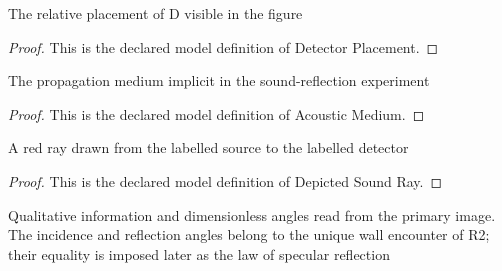 \begin{definition}
  \label{def:physics:phyx-mini-0330:phyxminiproblems-problemphyxmini0330-detectorplacement}
  The relative placement of D visible in the figure
\end{definition}
\begin{proof}
  This is the declared model definition of Detector Placement.
\end{proof}
\begin{definition}
  \label{def:physics:phyx-mini-0330:phyxminiproblems-problemphyxmini0330-acousticmedium}
  The propagation medium implicit in the sound-reflection experiment
\end{definition}
\begin{proof}
  This is the declared model definition of Acoustic Medium.
\end{proof}
\begin{definition}
  \label{def:physics:phyx-mini-0330:phyxminiproblems-problemphyxmini0330-depictedsoundray}
  A red ray drawn from the labelled source to the labelled detector
\end{definition}
\begin{proof}
  This is the declared model definition of Depicted Sound Ray.
\end{proof}
\begin{definition}
  \label{def:physics:phyx-mini-0330:phyxminiproblems-problemphyxmini0330-soundreflectionfigure}
  Qualitative information and dimensionless angles read from the primary image. The incidence and reflection angles belong to the unique wall encounter of R2; their equality is imposed later as the law of specular reflection
\end{definition}
